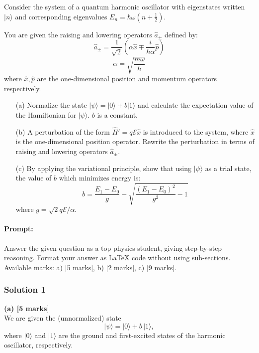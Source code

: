 \documentclass{article}
\begin{document}
Consider the system of a quantum harmonic oscillator with eigenstates written \(|n\rangle\) and corresponding eigenvalues \(E_n = \hbar\omega(n + \frac{1}{2})\). 

You are given the raising and lowering operators \(\hat{a}_\pm\) defined by:
\[
\hat{a}_\pm = \frac{1}{\sqrt{2}} \left(\alpha \hat{x} \mp \frac{i}{\hbar \alpha} \hat{p}\right)
\]
\[
\alpha = \sqrt{\frac{m\omega}{\hbar}}
\]
where \(\hat{x}, \hat{p}\) are the one-dimensional position and momentum operators respectively.

\begin{enumerate}
    \item[(a)] Normalize the state \(|\psi\rangle = |0\rangle + b |1\rangle\) and calculate the expectation value of the Hamiltonian for \(|\psi\rangle\). \(b\) is a constant.
    
    \item[(b)] A perturbation of the form \(\hat{H}' = q \mathcal{E} \hat{x}\) is introduced to the system, where \(\hat{x}\) is the one-dimensional position operator. Rewrite the perturbation in terms of raising and lowering operators \(\hat{a}_\pm\).
    
    \item[(c)] By applying the variational principle, show that using \(|\psi\rangle\) as a trial state, the value of \(b\) which minimizes energy is:
    \[
    b = \frac{E_1 - E_0}{g} - \sqrt{\frac{(E_1 - E_0)^2}{g^2} - 1}
    \]
    where \(g = \sqrt{2}q\mathcal{E}/\alpha\).
\end{enumerate}


\paragraph{Prompt: \\} 
Answer the given question as a top physics student, giving step-by-step reasoning. Format your answer as LaTeX code without using sub-sections. Available marks: a) [5 marks], b) [2 marks], c) [9 marks].


\subsubsection{Solution 1}

\noindent
\textbf{(a) [5 marks]}\\
We are given the (unnormalized) state
\[
|\psi\rangle = |0\rangle + b\,|1\rangle,
\]
where \(|0\rangle\) and \(|1\rangle\) are the ground and first-excited states of the harmonic oscillator, respectively. 
\end{document}
